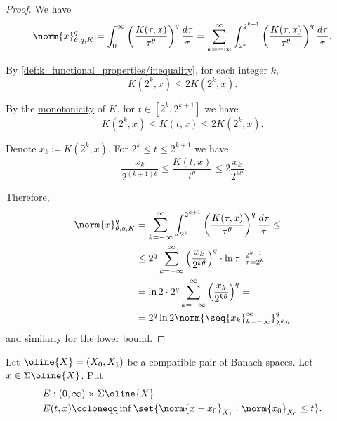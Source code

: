 \begin{proof}
  We have
  \begin{equation*}
    \norm{x}_{\theta,q,K}^q
    =
    \int_0^\infty \left( \frac {K(\tau, x)} {\tau^\theta} \right)^q \frac {d\tau} \tau
    =
    \sum_{k=-\infty}^\infty \int_{2^k}^{2^{k+1}} \left( \frac {K(\tau, x)} {\tau^\theta} \right)^q \frac {d\tau} \tau.
  \end{equation*}

  By \cref{def:k_functional_properties/inequality}, for each integer \( k \),
  \begin{equation*}
    K(2^k, x) \leq 2 K(2^k, x).
  \end{equation*}

  By the \hyperref[def:k_functional_properties/basic]{monotonicity} of \( K \), for \( t \in [2^k, 2^{k+1}] \) we have
  \begin{equation*}
    K(2^k, x) \leq K(t, x) \leq 2 K(2^k, x).
  \end{equation*}

  Denote \( x_k \coloneqq K(2^k, x) \). For \( 2^k \leq t \leq 2^{k+1} \) we have
  \begin{equation*}
    \frac{x_k}{2^{(k+1)\theta}} \leq \frac{K(t, x)}{t^\theta} \leq 2 \frac{x_k}{2^{k\theta}}
  \end{equation*}

  Therefore,
  \begin{align*}
    \norm{x}_{\theta,q,K}^q
    &=
    \sum_{k=-\infty}^\infty \int_{2^k}^{2^{k+1}} \left( \frac {K(\tau, x)} {\tau^\theta} \right)^q \frac {d\tau} \tau
    \leq \\ &\leq
    2^q \sum_{k=-\infty}^\infty \left(\frac{x_k}{2^{k\theta}} \right)^q \cdot \ln \tau \mid_{\tau=2^k}^{2^{k+1}}
    = \\ &=
    \ln 2 \cdot 2^q \sum_{k=-\infty}^\infty \left(\frac{x_k}{2^{k\theta}} \right)^q
    = \\ &=
    2^q \ln 2 \norm{\seq{ x_k }_{k=-\infty}^\infty}_{\lambda^{\theta,q}}^q
  \end{align*}
  and similarly for the lower bound.
\end{proof}

\begin{definition}\label{def:e_functional}
  Let \( \oline{X} = (X_0, X_1) \) be a compatible pair of Banach spaces. Let \( x \in \Sigma \oline{X} \). Put
  \begin{equation}\label{eq:def:e_functional}
    \begin{aligned}
      &E: (0, \infty) \times {\Sigma \oline{X}} \\
      &E(t, x) \coloneqq \inf \set{ \norm{x - x_0}_{X_1} : \norm{x_0}_{X_0} \leq t }.
    \end{aligned}
  \end{equation}
\end{definition}

